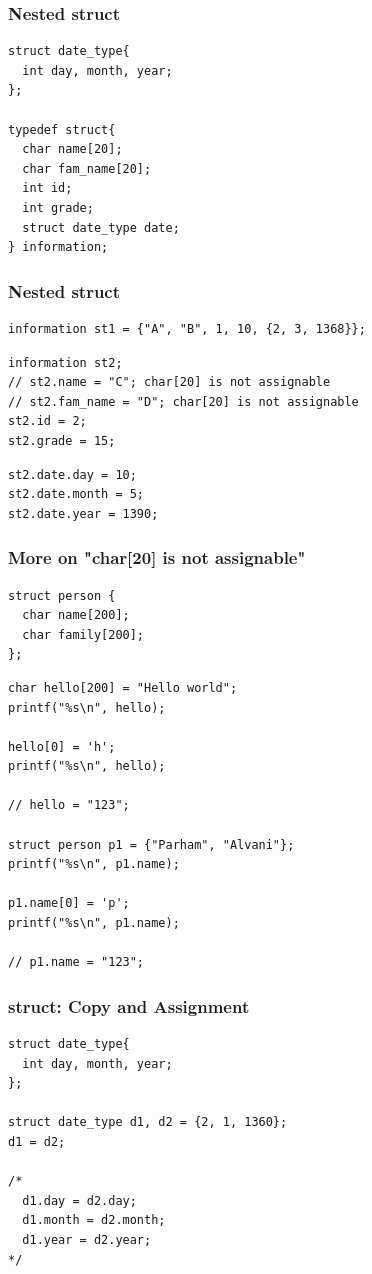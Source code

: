 \documentclass{../c-lecture}
\begin{document}
\begin{frame}[fragile]
  \frametitle{Nested struct}
  \begin{verbatim}
struct date_type{
  int day, month, year;
};

typedef struct{
  char name[20];
  char fam_name[20];
  int id;
  int grade;
  struct date_type date;
} information;
  \end{verbatim}
\end{frame}

\begin{frame}[fragile]
  \frametitle{Nested struct}
  \begin{verbatim}
information st1 = {"A", "B", 1, 10, {2, 3, 1368}};
  \end{verbatim}
  \begin{verbatim}
information st2;
// st2.name = "C"; char[20] is not assignable
// st2.fam_name = "D"; char[20] is not assignable
st2.id = 2;
st2.grade = 15;
  \end{verbatim}
  \begin{verbatim}
st2.date.day = 10;
st2.date.month = 5;
st2.date.year = 1390;
  \end{verbatim}
\end{frame}
\begin{frame}[fragile]
  \frametitle{More on "char[20] is not assignable"}
  \begin{verbatim}
struct person {
  char name[200];
  char family[200];
};
  \end{verbatim}
  \begin{verbatim}
char hello[200] = "Hello world";
printf("%s\n", hello);

hello[0] = 'h';
printf("%s\n", hello);

// hello = "123";

struct person p1 = {"Parham", "Alvani"};
printf("%s\n", p1.name);

p1.name[0] = 'p';
printf("%s\n", p1.name);

// p1.name = "123";
  \end{verbatim}
\end{frame}

\begin{frame}[fragile]
  \frametitle{struct: Copy and Assignment}
  \begin{verbatim}
struct date_type{
  int day, month, year;
};

struct date_type d1, d2 = {2, 1, 1360};
d1 = d2;

/*
  d1.day = d2.day;
  d1.month = d2.month;
  d1.year = d2.year;
*/
  \end{verbatim}
\end{frame}
\end{document}
